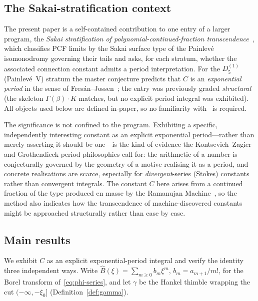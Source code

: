 \documentclass[11pt,reqno]{amsart}
\theoremstyle{plain}
\theoremstyle{definition}
\newcommand{\Bhat}{\widehat{B}}
\newcommand{\xizero}{\xi_0}
\providecommand{\C}{}\renewcommand{\C}{C}
\begin{document}
\subsection{The Sakai-stratification context}
The present paper is a self-contained contribution to one entry of a larger program, the
\emph{Sakai stratification of polynomial-continued-fraction transcendence}~\cite{Sakai}, which
classifies PCF limits by the Sakai surface type of the Painlev\'e isomonodromy governing their
tails and asks, for each stratum, whether the associated connection constant admits a period
interpretation. For the $D_5^{(1)}$ (Painlev\'e~V) stratum the master conjecture predicts that
$\C$ is an \emph{exponential period} in the sense of Fres\'an--Jossen~\cite{FJ}; the entry was
previously graded \emph{structural} (the skeleton $\Gamma(\beta)\cdot K$ matches, but no explicit
period integral was exhibited). All objects used below are defined in-paper, so no familiarity
with~\cite{Sakai} is required.

The significance is not confined to the program. Exhibiting a specific, independently interesting
constant as an explicit exponential period---rather than merely asserting it should be one---is the
kind of evidence the Kontsevich--Zagier and Grothendieck period philosophies call for: the
arithmetic of a number is conjecturally governed by the geometry of a motive realising it as a
period, and concrete realisations are scarce, especially for \emph{divergent}-series (Stokes)
constants rather than convergent integrals. The constant $\C$ here arises from a continued fraction
of the type produced en masse by the Ramanujan Machine~\cite{RamanujanMachine}, so the method also
indicates how the transcendence of machine-discovered constants might be approached structurally
rather than case by case.

\subsection{Main results}
We exhibit $\C$ as an explicit exponential-period integral and verify the identity three
independent ways. Write $\Bhat(\xi)=\sum_{m\ge0}b_m\xi^m$, $b_m=a_{m+1}/m!$, for the Borel
transform of~\eqref{eq:phi-series}, and let $\gamma$ be the Hankel thimble wrapping the cut
$(-\infty,-\xizero]$ (Definition~\ref{def:gamma}).
\end{document}
